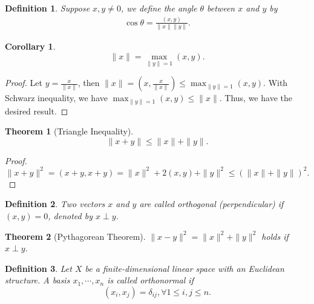 \documentclass[11pt]{book}
\newtheorem{definition}{Definition}[section]
\newtheorem{theorem}{Theorem}[section]
\newtheorem{corollary}{Corollary}[theorem]
\theoremstyle{definition}
\numberwithin{equation}{chapter}
\begin{document}
\medskip

\begin{definition}
Suppose $x,y\neq 0$, we define the angle $\theta$ between $x$ and $y$ by
\begin{align*}
    \cos \theta = \frac{(x,y)}{\|x\| \|y\|}.
\end{align*}
\end{definition}

\medskip

\begin{corollary}
$$\|x\| = \max_{\|y\| = 1} (x,y).$$
\end{corollary}
\begin{proof}
Let $y = \frac{x}{\|x\|}$, then $\|x\| = \left(x, \frac{x}{\|x\|}\right) \leq \max_{\|y\| = 1} (x,y)$. With Schwarz inequality, we have $\max_{\|y\| = 1} (x,y) \leq \|x\|$. Thus, we have the desired result.
\end{proof}

\medskip

\begin{theorem}[Triangle Inequality]
$$\|x+y\|\leq \|x\| + \|y\|.$$
\end{theorem}
\begin{proof}
$$\|x+y\|^2 = (x+y, x+y) = \|x\|^2 + 2(x,y) + \|y\|^2 \leq (\|x\| + \|y\|)^2.$$
\end{proof}

\medskip

\begin{definition}
Two vectors $x$ and $y$ are called orthogonal (perpendicular) if $(x,y) = 0$, denoted by $x \perp y$.
\end{definition}

\medskip

\begin{theorem}[Pythagorean Theorem]
$\|x-y\|^2 = \|x\|^2 + \|y\|^2$ holds if $x \perp y$.
\end{theorem}

\medskip

\begin{definition}
Let $X$ be a finite-dimensional linear space with an Euclidean structure. A basis $x_1, \cdots, x_n$ is called orthonormal if 
$$(x_i, x_j) = \delta_{ij}, \forall 1\leq i,j\leq n.$$
\end{definition}

\medskip
\end{document}
